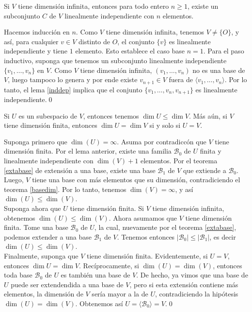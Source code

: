 \begin{lema}
Si $V$ tiene dimensi\'on infinita, entonces para todo entero $n\ge 1$, existe un subconjunto $C$ de $V$ linealmente independiente con $n$ elementos.
\end{lema}

\dem Hacemos inducci\'on en $n$. Como $V$ tiene dimensi\'on infinita, tenemos $V\ne\{O\}$, y as\'i, para cualquier $v\in V$ distinto de $O$, el conjunto $\{v\}$ es linealmente independiente y tiene $1$ elemento. Esto establece el caso base $n=1$. Para el paso inductivo, suponga que tenemos un subconjunto linealmente independiente $\{v_1,\ldots,v_n\}$ en $V$. Como $V$ tiene dimensi\'on infinita, $(v_1,\ldots,v_n)$ no es una base de $V$, luego tampoco lo genera y por ende existe $v_{n+1}\in V$ fuera de $\langle v_1,\ldots,v_n\rangle$. Por lo tanto, el lema \ref{inddep} implica que el conjunto $\{v_1,\ldots,v_n,v_{n+1}\}$ es linealmente independiente.\qed

\begin{teo}\label{monodim}
Si $U$ es un subespacio de $V$, entonces tenemos $\dim U\le \dim V$. M\'as a\'un, si $V$ tiene dimensi\'on finita, entonces $\dim U=\dim V$ si y solo si $U=V$.
\end{teo}

\dem Suponga primero que $\dim(U)=\infty$. Asuma por contradicc\'on que $V$ tiene dimensi\'on finita. Por el lema anterior, existe una familia $\mathcal{B}_0$ de $U$ finita y linealmente independiente con $\dim(V)+1$ elementos. Por el teorema \ref{extabase} de extensión a una base, existe una base $\mathcal{B}_1$ de $V$ que extiende a $\mathcal{B}_0$. Luego, $V$ tiene una base con m\'as elementos que su dimensi\'on, contradiciendo el teorema \ref{basedim}. Por lo tanto, tenemos $\dim(V)=\infty$, y as\'i $\dim(U)\le\dim(V)$.\\
Suponga ahora que $U$ tiene dimensi\'on finita. Si $V$ tiene dimensi\'on infinita, obtenemos $\dim(U)\le\dim(V)$. Ahora asumamos que $V$ tiene dimensi\'on finita. Tome una base $\mathcal{B}_0$ de $U$, la cual, nuevamente por el teorema \ref{extabase}, podemos extender a una base $\mathcal{B}_1$ de $V$. Tenemos entonces $|\mathcal{B}_0|\le|\mathcal{B}_1|$, es decir $\dim(U)\le\dim(V)$.\\
Finalmente, suponga que $V$ tiene dimensi\'on finita. Evidentemente, si $U=V$, entonces $\dim U=\dim V$. Recíprocamente, si $\dim(U)=\dim(V)$, entonces toda base $\mathcal{B}_0$ de $U$ es tambi\'en una base de $V$. De hecho, ya vimos que una base de $U$ puede ser extendendida a una base de $V$, pero si esta extensi\'on contiene m\'as elementos, la dimensi\'on de $V$ ser\'ia mayor a la de $U$, contradiciendo la hip\'otesis $\dim(U)=\dim(V)$. Obtenemos as\'i $U=\langle \mathcal{B}_0\rangle=V$.\qed

